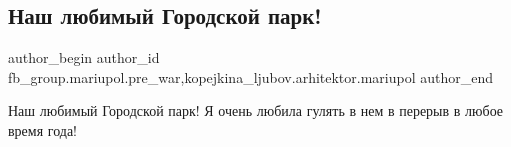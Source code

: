  
 
 
 
 

\subsection{Наш любимый Городской парк!}
\label{sec:12_02_2023.fb.fb_group.mariupol.pre_war.6.nash_lyubimii_gorods}
 
\ifcmt
 author_begin
   author_id fb_group.mariupol.pre_war,kopejkina_ljubov.arhitektor.mariupol
 author_end
\fi

Наш любимый Городской парк! Я очень любила гулять в нем в перерыв в любое время
года!


